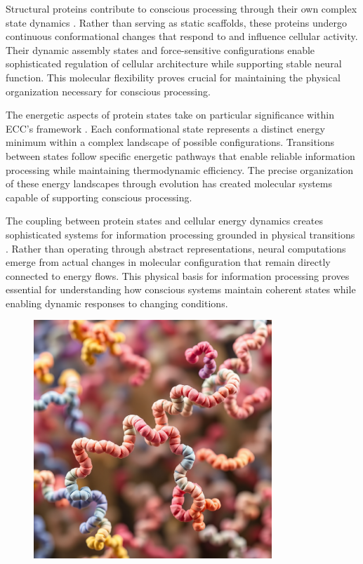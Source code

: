 \begin{refsection}
Structural proteins contribute to conscious processing through their own complex state dynamics \cite{Frauenfelder2009}. Rather than serving as static scaffolds, these proteins undergo continuous conformational changes that respond to and influence cellular activity. Their dynamic assembly states and force-sensitive configurations enable sophisticated regulation of cellular architecture while supporting stable neural function. This molecular flexibility proves crucial for maintaining the physical organization necessary for conscious processing.

The energetic aspects of protein states take on particular significance within ECC's framework \cite{Karplus2005}. Each conformational state represents a distinct energy minimum within a complex landscape of possible configurations. Transitions between states follow specific energetic pathways that enable reliable information processing while maintaining thermodynamic efficiency. The precise organization of these energy landscapes through evolution has created molecular systems capable of supporting conscious processing.

The coupling between protein states and cellular energy dynamics creates sophisticated systems for information processing grounded in physical transitions \cite{Zhou2008}. Rather than operating through abstract representations, neural computations emerge from actual changes in molecular configuration that remain directly connected to energy flows. This physical basis for information processing proves essential for understanding how conscious systems maintain coherent states while enabling dynamic responses to changing conditions.

\begin{figure}[h]
    \centering
    \includegraphics[width=0.8\textwidth]{images/protein.png}


\end{figure}
\end{refsection}
